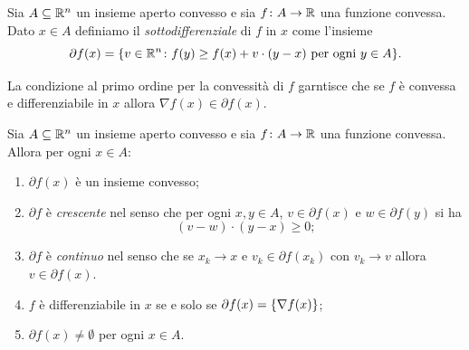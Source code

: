 \begin{definition}[sottodifferenziale]
Sia $A\subseteq {\mathbb R}^n$ un insieme aperto convesso e sia $f\colon A \to {\mathbb R}$ una funzione convessa.
Dato $x \in A$ definiamo il \emph{sottodifferenziale} di $f$ in $x$ come l'insieme
\[
  \partial f(x) = {\left\{ v\in {\mathbb R}^n\colon f(y) \ge f(x) + v\cdot (y-x) \text{ per ogni } y\in A \right\}}.
\]
\end{definition}

La condizione al primo ordine per la convessità di $f$ 
garntisce che se $f$ è convessa e differenziabile in $x$ allora $\nabla f (x) \in \partial f(x)$.

\begin{theorem}
Sia $A\subseteq {\mathbb R}^n$ un insieme aperto convesso e sia $f\colon A \to {\mathbb R}$ una funzione convessa.
Allora per ogni $x\in A$:
\begin{enumerate}
  \item $\partial f(x)$ è un insieme convesso;
  \item $\partial f$ è \emph{crescente} nel senso che
  per ogni $x,y\in A$, $v\in \partial f(x)$ e $w\in \partial f(y)$ si ha
  \[
    (v-w)\cdot (y-x) \ge 0;
  \]
  \item $\partial f$ è \emph{continuo} nel senso che se $x_k\to x$ e $v_k\in \partial f(x_k)$ con $v_k\to v$ allora $v\in \partial f(x)$.
  \item $f$ è differenziabile in $x$ se e solo se $\partial f(x)= {\left\{ \nabla f(x) \right\}}$;
  \item $\partial f(x) \neq \emptyset$ per ogni $x\in A$.
\end{enumerate}
\end{theorem}
